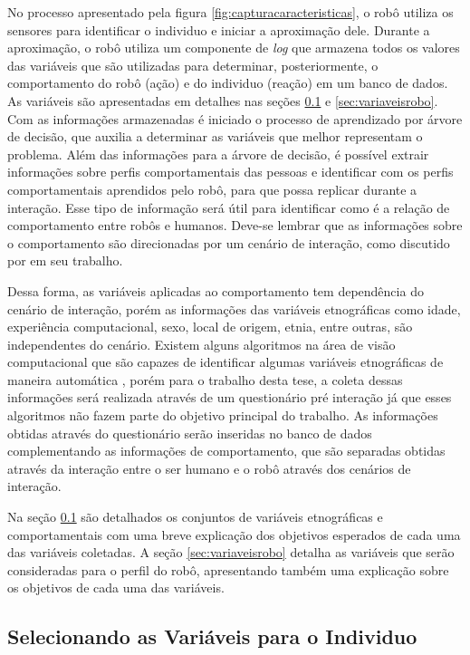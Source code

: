 No processo apresentado pela figura \ref{fig:capturacaracteristicas}, o robô utiliza os sensores para identificar o individuo e iniciar a aproximação dele. Durante a aproximação, o robô utiliza um componente de \emph{log} que armazena todos os valores das variáveis que são utilizadas para determinar, posteriormente, o comportamento do robô (ação) e do individuo (reação) em um banco de dados. As variáveis são apresentadas em detalhes nas seções \ref{sec:variaveisindividuo} e \ref{sec:variaveisrobo}. Com as informações armazenadas é iniciado o processo de aprendizado por árvore de decisão, que auxilia a determinar as variáveis que melhor representam o problema. Além das informações para a árvore de decisão, é possível extrair informações sobre perfis comportamentais das pessoas e identificar com os perfis comportamentais aprendidos pelo robô, para que possa replicar durante a interação. Esse tipo de informação será útil para identificar como é a relação de comportamento entre robôs e humanos. Deve-se lembrar que as informações sobre o comportamento são direcionadas por um cenário de interação, como discutido por  em seu trabalho.

Dessa forma, as variáveis aplicadas ao comportamento tem dependência do cenário de interação, porém as informações das variáveis etnográficas como idade, experiência computacional, sexo, local de origem, etnia, entre outras, são independentes do cenário. Existem alguns algoritmos na área de visão computacional que são capazes de identificar algumas variáveis etnográficas de maneira automática \cite{Yang:2007, Shan:2012, Ylioinas:2012, Samadi:2013, Amaral:2014}, porém para o trabalho desta tese, a coleta dessas informações será realizada através de um questionário pré interação já que esses algoritmos não fazem parte do objetivo principal do trabalho. As informações obtidas através do questionário serão inseridas no banco de dados complementando as informações de comportamento, que são separadas obtidas através da interação entre o ser humano e o robô através dos cenários de interação.

Na seção \ref{sec:variaveisindividuo} são detalhados os conjuntos de variáveis etnográficas e comportamentais com uma breve explicação dos objetivos esperados de cada uma das variáveis coletadas. A seção \ref{sec:variaveisrobo} detalha as variáveis que serão consideradas para o perfil do robô, apresentando também uma explicação sobre os objetivos de cada uma das variáveis.

\subsection{Selecionando as Variáveis para o Individuo}
\label{sec:variaveisindividuo}


